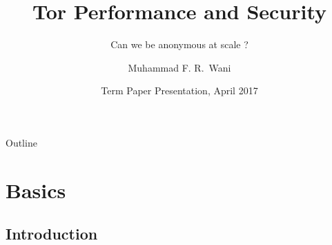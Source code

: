 \documentclass{beamer}
\title[Tor Perf \& Sec]{Tor Performance and Security}
\subtitle{Can we be anonymous at scale ?}
\author{Muhammad F. R.~Wani}
\institute[IIIT-D] %
{
  Department of Computer Science \\
  
  Indraprashta Institute \textit{of} \\
  Information Technology Delhi\\
}
\date[RM5XX -- April 2017]{Term Paper Presentation, April 2017}
\begin{document}
\begin{frame}
  \titlepage
\end{frame}

\begin{frame}{Outline}
  \tableofcontents
\end{frame}

\section{Basics}

\subsection{Introduction}
\end{document}
